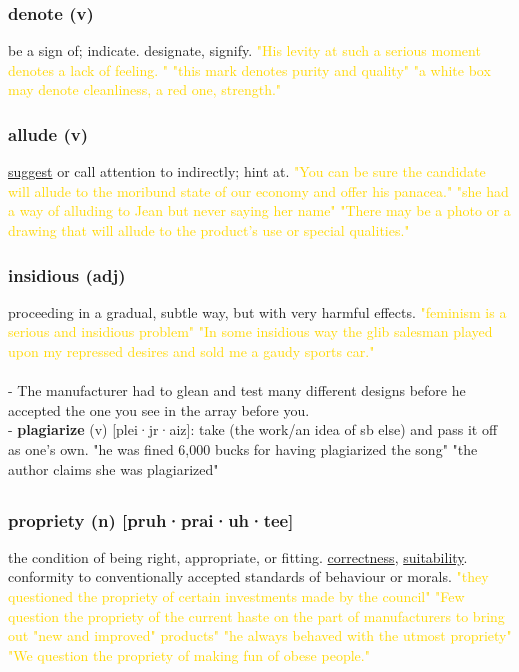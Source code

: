 \documentclass{proc}
\begin{document}
	\subsubsection{\textcolor{brickred}{denote} (v)}
	be a sign of; indicate. designate, signify.
	\textcolor{gold}{"His levity at such a serious moment denotes a lack of feeling. " "this mark denotes purity and quality" "a white box may denote cleanliness, a red one, strength."}
	
	\subsubsection{\textcolor{brickred}{allude} (v)}
	\underline{suggest} or call attention to indirectly; hint at.
	\textcolor{gold}{"You can be sure the candidate will allude to the moribund state of our economy and offer his panacea." "she had a way of alluding to Jean but never saying her name" "There may be a photo or a drawing that will allude to the product's use or special qualities."}
	
	\subsubsection{\textcolor{brickred}{insidious} (adj)}
	proceeding in a gradual, subtle way, but with very harmful effects.
	\textcolor{gold}{"feminism is a serious and insidious problem" "In some insidious way the glib salesman played upon my repressed desires and sold me a gaudy sports car."}\\\\
	- The manufacturer had to glean and test many different designs before he accepted the one you see in the array before you.\\
	- \textbf{plagiarize} (v) [plei·jr·aiz]: take (the work/an idea of sb else) and pass it off as one's own. "he was fined 6,000 bucks for having plagiarized the song" "the author claims she was plagiarized"
	
	\newpage
	\subsection{}
	\subsubsection{\textcolor{brickred}{propriety} (n) [pruh·prai·uh·tee]}
	the condition of being right, appropriate, or fitting. \underline{correctness}, \underline{suitability}. conformity to conventionally accepted standards of behaviour or morals.
	\textcolor{gold}{"they questioned the propriety of certain investments made by the council" "Few question the propriety of the current haste on the part of manufacturers to bring out "new and improved" products" "he always behaved with the utmost propriety" "We question the propriety of making fun of obese people."}
	
\end{document}
